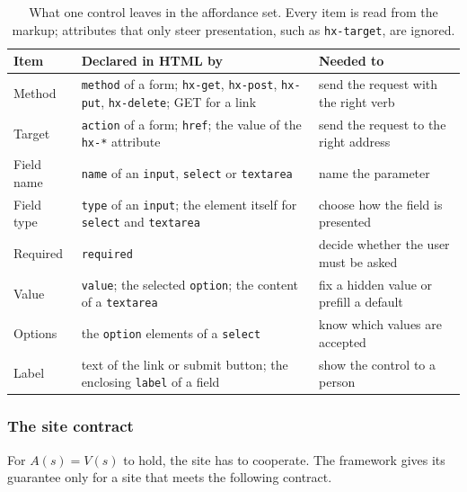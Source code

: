 \begin{table}[htbp]
\centering
\caption{What one control leaves in the affordance set. Every item is read from the markup; attributes that only steer presentation, such as \texttt{hx-target}, are ignored.}
\label{tab:design:affordance}
\renewcommand{\arraystretch}{1.3}
\begin{tabularx}{\textwidth}{lLL}
\hline
Item & Declared in HTML by & Needed to \\
\hline
Method & \texttt{method} of a form; \texttt{hx-get}, \texttt{hx-post}, \texttt{hx-put}, \texttt{hx-delete}; GET for a link & send the request with the right verb \\
\hline
Target & \texttt{action} of a form; \texttt{href}; the value of the \texttt{hx-*} attribute & send the request to the right address \\
\hline
Field name & \texttt{name} of an \texttt{input}, \texttt{select} or \texttt{textarea} & name the parameter \\
\hline
Field type & \texttt{type} of an \texttt{input}; the element itself for \texttt{select} and \texttt{textarea} & choose how the field is presented \\
\hline
Required & \texttt{required} & decide whether the user must be asked \\
\hline
Value & \texttt{value}; the selected \texttt{option}; the content of a \texttt{textarea} & fix a hidden value or prefill a default \\
\hline
Options & the \texttt{option} elements of a \texttt{select} & know which values are accepted \\
\hline
Label & text of the link or submit button; the enclosing \texttt{label} of a field & show the control to a person \\
\hline
\end{tabularx}
\end{table}

\subsubsection{The site contract}\label{sec:design:contracts}\label{sec:design:site-contract}

For $A(s) = V(s)$ to hold, the site has to cooperate.
The framework gives its guarantee only for a site that meets the following contract.

